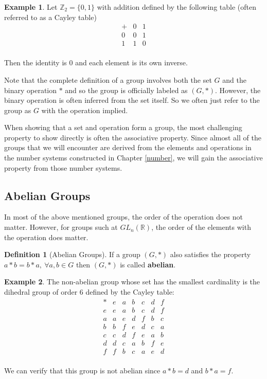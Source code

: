 \documentclass[
]{book}
\theoremstyle{definition}
\newtheorem{definition}{Definition}[chapter]
\theoremstyle{definition}
\newtheorem{example}{Example}[chapter]
\theoremstyle{definition}
\theoremstyle{definition}
\theoremstyle{remark}
\begin{document}
\begin{example}
\protect\hypertarget{exm:z2}{}\label{exm:z2}Let \(\mathbb{Z}_2=\{0,1\}\) with addition defined by the following table (often referred to as a Cayley table)
\[\begin{array}{c|cc}
+ & 0 & 1 \\ \hline
0 & 0 & 1 \\
1 & 1 & 0 \\
\end{array}\]

Then the identity is \(0\) and each element is its own inverse.
\end{example}

Note that the complete definition of a group involves both the set \(G\) and the binary operation \(*\) and so the group is officially labeled as \((G,*)\). However, the binary operation is often inferred from the set itself. So we often just refer to the group as \(G\) with the operation implied.

When showing that a set and operation form a group, the most challenging property to show directly is often the associative property. Since almost all of the groups that we will encounter are derived from the elements and operations in the number systems constructed in Chapter \ref{number}, we will gain the associative property from those number systems.

\hypertarget{abelian-groups}{%
\subsection{Abelian Groups}\label{abelian-groups}}

In most of the above mentioned groups, the order of the operation does not matter. However, for groups such at \(GL_n(\mathbb{R})\), the order of the elements with the operation does matter.

\begin{definition}[Abelian Groups]
If a group \((G,*)\) also satisfies the property \(a*b=b*a, \: \forall a,b\in G\)
then \((G,*)\) is called \textbf{abelian}.
\end{definition}

\begin{example}
\protect\hypertarget{exm:dihedral6}{}\label{exm:dihedral6}The non-abelian group whose set has the smallest cardinality is the dihedral group of order 6 defined by the Cayley table:
\[\begin{array}{c|cccccc}
* & e & a & b & c & d & f \\ \hline
e & e & a & b & c & d & f \\
a & a & e & d & f & b & c \\
b & b & f & e & d & c & a \\
c & c & d & f & e & a & b \\
d & d & c & a & b & f & e \\
f & f & b & c & a & e & d \\
\end{array}\]

We can verify that this group is not abelian since \(a*b = d\) and \(b*a=f\).
\end{example}
\end{document}
